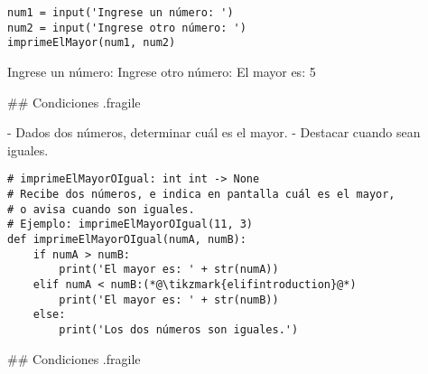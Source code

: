 
\begin{lstlisting}
num1 = input('Ingrese un número: ')
num2 = input('Ingrese otro número: ')
imprimeElMayor(num1, num2)
\end{lstlisting}



\begin{exampleConsole}
Ingrese un número: 
Ingrese otro número: 
El mayor es: 5
\end{exampleConsole}

\trmcolumns

\pause

\vspace{-3ex}


## Condiciones {.fragile}


\vspace{-3ex}

- Dados dos números, determinar cuál es el mayor.
    - \alert{Destacar cuando sean iguales.}

\begin{lstlisting}
# imprimeElMayorOIgual: int int -> None
# Recibe dos números, e indica en pantalla cuál es el mayor,
# o avisa cuando son iguales.
# Ejemplo: imprimeElMayorOIgual(11, 3)
def imprimeElMayorOIgual(numA, numB):
    if numA > numB:
        print('El mayor es: ' + str(numA))
    elif numA < numB:(*@\tikzmark{elifintroduction}@*)
        print('El mayor es: ' + str(numB))
    else:
        print('Los dos números son iguales.')
\end{lstlisting}

\vspace{-3ex}

## Condiciones {.fragile}

\vspace{-3ex}

